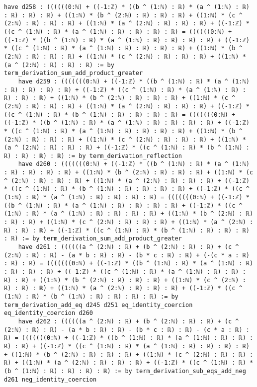 \documentclass{article}
\begin{document}
\begin{tcolorbox}[colback=white!10, width=\linewidth]
\begin{lstlisting}[language=Lean4]
    have d258 : ((((((0:ℕ) + ((-1:ℤ) * ((b ^ (1:ℕ) : ℝ) * (a ^ (1:ℕ) : ℝ) : ℝ) : ℝ) : ℝ) + ((1:ℕ) * (b ^ (2:ℕ) : ℝ) : ℝ) : ℝ) + ((1:ℕ) * (c ^ (2:ℕ) : ℝ) : ℝ) : ℝ) + ((1:ℕ) * (a ^ (2:ℕ) : ℝ) : ℝ) : ℝ) + ((-1:ℤ) * ((c ^ (1:ℕ) : ℝ) * (a ^ (1:ℕ) : ℝ) : ℝ) : ℝ) : ℝ) = ((((((0:ℕ) + ((-1:ℤ) * ((b ^ (1:ℕ) : ℝ) * (a ^ (1:ℕ) : ℝ) : ℝ) : ℝ) : ℝ) + ((-1:ℤ) * ((c ^ (1:ℕ) : ℝ) * (a ^ (1:ℕ) : ℝ) : ℝ) : ℝ) : ℝ) + ((1:ℕ) * (b ^ (2:ℕ) : ℝ) : ℝ) : ℝ) + ((1:ℕ) * (c ^ (2:ℕ) : ℝ) : ℝ) : ℝ) + ((1:ℕ) * (a ^ (2:ℕ) : ℝ) : ℝ) : ℝ) := by term_derivation_sum_add_product_greater
    have d259 : (((((((0:ℕ) + ((-1:ℤ) * ((b ^ (1:ℕ) : ℝ) * (a ^ (1:ℕ) : ℝ) : ℝ) : ℝ) : ℝ) + ((-1:ℤ) * ((c ^ (1:ℕ) : ℝ) * (a ^ (1:ℕ) : ℝ) : ℝ) : ℝ) : ℝ) + ((1:ℕ) * (b ^ (2:ℕ) : ℝ) : ℝ) : ℝ) + ((1:ℕ) * (c ^ (2:ℕ) : ℝ) : ℝ) : ℝ) + ((1:ℕ) * (a ^ (2:ℕ) : ℝ) : ℝ) : ℝ) + ((-1:ℤ) * ((c ^ (1:ℕ) : ℝ) * (b ^ (1:ℕ) : ℝ) : ℝ) : ℝ) : ℝ) = (((((((0:ℕ) + ((-1:ℤ) * ((b ^ (1:ℕ) : ℝ) * (a ^ (1:ℕ) : ℝ) : ℝ) : ℝ) : ℝ) + ((-1:ℤ) * ((c ^ (1:ℕ) : ℝ) * (a ^ (1:ℕ) : ℝ) : ℝ) : ℝ) : ℝ) + ((1:ℕ) * (b ^ (2:ℕ) : ℝ) : ℝ) : ℝ) + ((1:ℕ) * (c ^ (2:ℕ) : ℝ) : ℝ) : ℝ) + ((1:ℕ) * (a ^ (2:ℕ) : ℝ) : ℝ) : ℝ) + ((-1:ℤ) * ((c ^ (1:ℕ) : ℝ) * (b ^ (1:ℕ) : ℝ) : ℝ) : ℝ) : ℝ) := by term_derivation_reflection
    have d260 : (((((((0:ℕ) + ((-1:ℤ) * ((b ^ (1:ℕ) : ℝ) * (a ^ (1:ℕ) : ℝ) : ℝ) : ℝ) : ℝ) + ((1:ℕ) * (b ^ (2:ℕ) : ℝ) : ℝ) : ℝ) + ((1:ℕ) * (c ^ (2:ℕ) : ℝ) : ℝ) : ℝ) + ((1:ℕ) * (a ^ (2:ℕ) : ℝ) : ℝ) : ℝ) + ((-1:ℤ) * ((c ^ (1:ℕ) : ℝ) * (b ^ (1:ℕ) : ℝ) : ℝ) : ℝ) : ℝ) + ((-1:ℤ) * ((c ^ (1:ℕ) : ℝ) * (a ^ (1:ℕ) : ℝ) : ℝ) : ℝ) : ℝ) = (((((((0:ℕ) + ((-1:ℤ) * ((b ^ (1:ℕ) : ℝ) * (a ^ (1:ℕ) : ℝ) : ℝ) : ℝ) : ℝ) + ((-1:ℤ) * ((c ^ (1:ℕ) : ℝ) * (a ^ (1:ℕ) : ℝ) : ℝ) : ℝ) : ℝ) + ((1:ℕ) * (b ^ (2:ℕ) : ℝ) : ℝ) : ℝ) + ((1:ℕ) * (c ^ (2:ℕ) : ℝ) : ℝ) : ℝ) + ((1:ℕ) * (a ^ (2:ℕ) : ℝ) : ℝ) : ℝ) + ((-1:ℤ) * ((c ^ (1:ℕ) : ℝ) * (b ^ (1:ℕ) : ℝ) : ℝ) : ℝ) : ℝ) := by term_derivation_sum_add_product_greater
    have d261 : ((((((a ^ (2:ℕ) : ℝ) + (b ^ (2:ℕ) : ℝ) : ℝ) + (c ^ (2:ℕ) : ℝ) : ℝ) - (a * b : ℝ) : ℝ) - (b * c : ℝ) : ℝ) + (-(c * a : ℝ) : ℝ) : ℝ) = (((((((0:ℕ) + ((-1:ℤ) * ((b ^ (1:ℕ) : ℝ) * (a ^ (1:ℕ) : ℝ) : ℝ) : ℝ) : ℝ) + ((-1:ℤ) * ((c ^ (1:ℕ) : ℝ) * (a ^ (1:ℕ) : ℝ) : ℝ) : ℝ) : ℝ) + ((1:ℕ) * (b ^ (2:ℕ) : ℝ) : ℝ) : ℝ) + ((1:ℕ) * (c ^ (2:ℕ) : ℝ) : ℝ) : ℝ) + ((1:ℕ) * (a ^ (2:ℕ) : ℝ) : ℝ) : ℝ) + ((-1:ℤ) * ((c ^ (1:ℕ) : ℝ) * (b ^ (1:ℕ) : ℝ) : ℝ) : ℝ) : ℝ) := by term_derivation_add_eq d245 d251 eq_identity_coercion eq_identity_coercion d260
    have d262 : ((((((a ^ (2:ℕ) : ℝ) + (b ^ (2:ℕ) : ℝ) : ℝ) + (c ^ (2:ℕ) : ℝ) : ℝ) - (a * b : ℝ) : ℝ) - (b * c : ℝ) : ℝ) - (c * a : ℝ) : ℝ) = (((((((0:ℕ) + ((-1:ℤ) * ((b ^ (1:ℕ) : ℝ) * (a ^ (1:ℕ) : ℝ) : ℝ) : ℝ) : ℝ) + ((-1:ℤ) * ((c ^ (1:ℕ) : ℝ) * (a ^ (1:ℕ) : ℝ) : ℝ) : ℝ) : ℝ) + ((1:ℕ) * (b ^ (2:ℕ) : ℝ) : ℝ) : ℝ) + ((1:ℕ) * (c ^ (2:ℕ) : ℝ) : ℝ) : ℝ) + ((1:ℕ) * (a ^ (2:ℕ) : ℝ) : ℝ) : ℝ) + ((-1:ℤ) * ((c ^ (1:ℕ) : ℝ) * (b ^ (1:ℕ) : ℝ) : ℝ) : ℝ) : ℝ) := by term_derivation_sub_eqs_add_neg d261 neg_identity_coercion

\end{lstlisting}
\end{tcolorbox}
\end{document}
